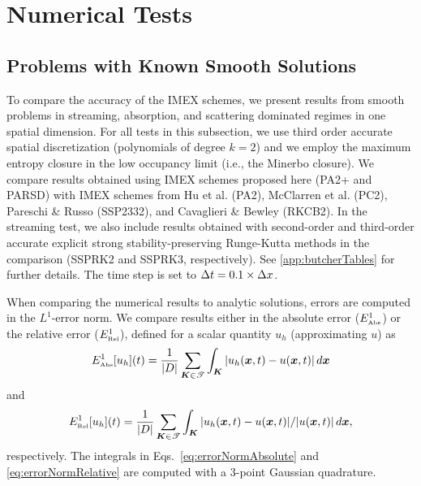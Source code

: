 \section{Numerical Tests}
\label{sec:numerical}

\subsection{Problems with Known Smooth Solutions}
\label{sec:smoothProblems}

To compare the accuracy of the IMEX schemes, we present results from smooth problems in streaming, absorption, and scattering dominated regimes in one spatial dimension.  
For all tests in this subsection, we use third order accurate spatial discretization (polynomials of degree $k=2$) and we employ the maximum entropy closure in the low occupancy limit (i.e., the Minerbo closure).  
We compare results obtained using IMEX schemes proposed here (PA2+ and PARSD) with IMEX schemes from Hu et al. \cite{hu_etal_2017} (PA2), McClarren et al. \cite{mcclarren_etal_2008} (PC2), Pareschi \& Russo \cite{pareschiRusso_2005} (SSP2332), and Cavaglieri \& Bewley \cite{cavaglieriBewley2015} (RKCB2).  
In the streaming test, we also include results obtained with second-order and third-order accurate explicit strong stability-preserving Runge-Kutta methods \cite{gottlieb_etal_2001} in the comparison (SSPRK2 and SSPRK3, respectively).  
See \ref{app:butcherTables} for further details.  
The time step is set to $\Delta t=0.1\times\Delta x$.  

When comparing the numerical results to analytic solutions, errors are computed in the $L^{1}$-error norm.  
We compare results either in the absolute error ($E_{\mbox{\tiny Abs}}^{1}$) or the relative error ($E_{\mbox{\tiny Rel}}^{1}$), defined for a scalar quantity $u_{h}$ (approximating $u$) as
\begin{equation}
  E_{\mbox{\tiny Abs}}^{1}[u_{h}](t)
  =\frac{1}{|D|}\sum_{\boldsymbol{K}\in\mathscr{T}}\int_{\boldsymbol{K}}|u_{h}(\boldsymbol{x},t)-u(\boldsymbol{x},t)|\,d\boldsymbol{x}
  \label{eq:errorNormAbsolute}
\end{equation}
and
\begin{equation}
  E_{\mbox{\tiny Rel}}^{1}[u_{h}](t)
  =\frac{1}{|D|}\sum_{\boldsymbol{K}\in\mathscr{T}}\int_{\boldsymbol{K}}|u_{h}(\boldsymbol{x},t)-u(\boldsymbol{x},t)|/|u(\boldsymbol{x},t)|\,d\boldsymbol{x},
  \label{eq:errorNormRelative}
\end{equation}
respectively.  
The integrals in Eqs.~\eqref{eq:errorNormAbsolute} and \eqref{eq:errorNormRelative} are computed with a $3$-point Gaussian quadrature.  

